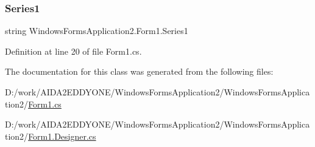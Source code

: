 \subsubsection{\texorpdfstring{Series1}{Series1}}
{\footnotesize\ttfamily string Windows\+Forms\+Application2.\+Form1.\+Series1\hspace{0.3cm}{\ttfamily [get]}}



Definition at line 20 of file Form1.\+cs.



The documentation for this class was generated from the following files\+:\begin{DoxyCompactItemize}
\item 
D\+:/work/\+A\+I\+D\+A2\+E\+D\+D\+Y\+O\+N\+E/\+Windows\+Forms\+Application2/\+Windows\+Forms\+Application2/\hyperlink{_form1_8cs}{Form1.\+cs}\item 
D\+:/work/\+A\+I\+D\+A2\+E\+D\+D\+Y\+O\+N\+E/\+Windows\+Forms\+Application2/\+Windows\+Forms\+Application2/\hyperlink{_form1_8_designer_8cs}{Form1.\+Designer.\+cs}\end{DoxyCompactItemize}
